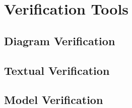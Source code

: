 \chapter{Verification Tools}

\section{Diagram Verification}
\section{Textual Verification}
\section{Model Verification}
